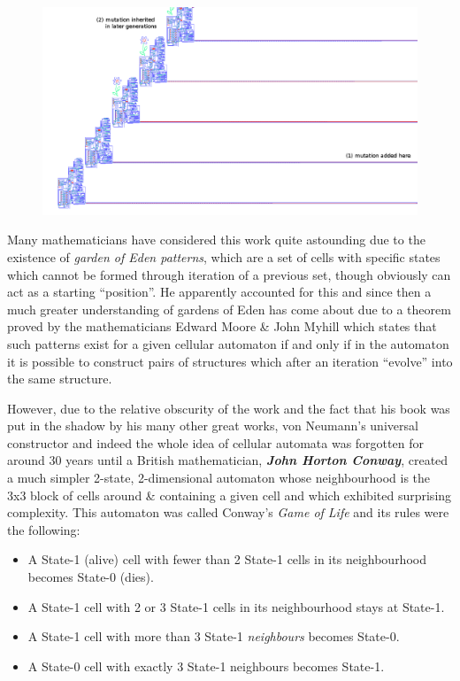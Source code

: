 \begin{figure}[htbp]
\centering
\includegraphics{image_3.png}
\caption{}
\end{figure}

Many mathematicians have considered this work quite astounding due to
the existence of \emph{garden of Eden patterns}, which are a set of
cells with specific states which cannot be formed through iteration of a
previous set, though obviously can act as a starting ``position''. He
apparently accounted for this and since then a much greater
understanding of gardens of Eden has come about due to a theorem proved
by the mathematicians Edward Moore \& John Myhill which states that such
patterns exist for a given cellular automaton if and only if in the
automaton it is possible to construct pairs of structures which after an
iteration ``evolve'' into the same structure.

However, due to the relative obscurity of the work and the fact that his
book was put in the shadow by his many other great works, von Neumann's
universal constructor and indeed the whole idea of cellular automata was
forgotten for around 30 years until a British mathematician,
\textbf{\emph{John Horton Conway}}, created a much simpler 2-state,
2-dimensional automaton whose neighbourhood is the 3x3 block of cells
around \& containing a given cell and which exhibited surprising
complexity. This automaton was called Conway's \emph{Game of Life} and
its rules were the following:

\begin{itemize}
\item
  A State-1 (alive) cell with fewer than 2 State-1 cells in its
  neighbourhood becomes State-0 (dies).
\item
  A State-1 cell with 2 or 3 State-1 cells in its neighbourhood stays at
  State-1.
\item
  A State-1 cell with more than 3 State-1 \emph{neighbours} becomes
  State-0.
\item
  A State-0 cell with exactly 3 State-1 neighbours becomes State-1.
\end{itemize}

